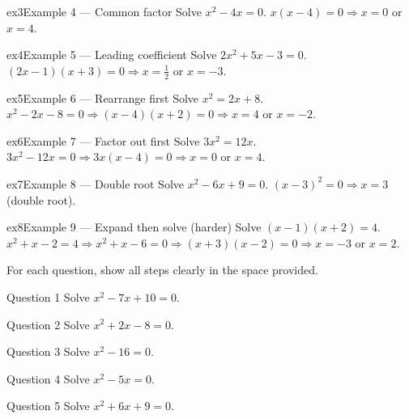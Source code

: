 \documentclass[11pt]{article}
\begin{document}
\begin{example}{ex3}{Example 4 --- Common factor}
Solve $x^2-4x=0$.
\soln $x(x-4)=0\Rightarrow x=0$ or $x=4.$
\end{example}

\begin{example}{ex4}{Example 5 --- Leading coefficient}
Solve $2x^2+5x-3=0$.
\soln $(2x-1)(x+3)=0\Rightarrow x=\tfrac12$ or $x=-3.$
\end{example}

\begin{example}{ex5}{Example 6 --- Rearrange first}
Solve $x^2=2x+8$.
\soln $x^2-2x-8=0\Rightarrow (x-4)(x+2)=0\Rightarrow x=4$ or $x=-2.$
\end{example}

\begin{example}{ex6}{Example 7 --- Factor out first}
Solve $3x^2=12x$.
\soln $3x^2-12x=0\Rightarrow 3x(x-4)=0\Rightarrow x=0$ or $x=4.$
\end{example}

\begin{example}{ex7}{Example 8 --- Double root}
Solve $x^2-6x+9=0$.
\soln $(x-3)^2=0\Rightarrow x=3$ (double root).
\end{example}

\begin{example}{ex8}{Example 9 --- Expand then solve (harder)}
Solve $(x-1)(x+2)=4$.
\soln $x^2+x-2=4\Rightarrow x^2+x-6=0\Rightarrow (x+3)(x-2)=0\Rightarrow x=-3$ or $x=2.$
\end{example}

\clearpage
{}
For each question, show all steps clearly in the space provided.

\begin{qbox}{Question 1}
Solve $x^2-7x+10=0$.\workspace{2.0cm}
\end{qbox}

\begin{qbox}{Question 2}
Solve $x^2+2x-8=0$.\workspace{2.0cm}
\end{qbox}

\begin{qbox}{Question 3}
Solve $x^2-16=0$.\workspace{1.8cm}
\end{qbox}

\begin{qbox}{Question 4}
Solve $x^2-5x=0$.\workspace{1.8cm}
\end{qbox}

\begin{qbox}{Question 5}
Solve $x^2+6x+9=0$.\workspace{1.8cm}
\end{qbox}
\end{document}

